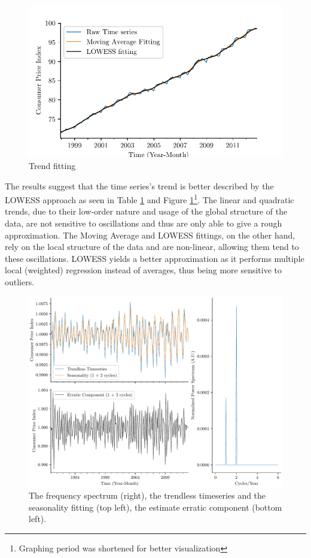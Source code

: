\documentclass[conference]{IEEEtran}
\begin{document}
\begin{figure}[hbtp]
    \centering
    \includegraphics[scale=0.68]{../figs/trend.pdf}
    \caption{Trend fitting}
    \label{fig:trend}
\end{figure}

The results suggest that the time series's trend is better described by the LOWESS approach as seen in Table \ref{fig:trend} and Figure \ref{fig:trend}\footnote{Graphing period was shortened for better visualization}. The linear and quadratic trends, due to their low-order nature and usage of the global structure of the data, are not sensitive to oscillations and thus are only able to give a rough approximation. The Moving Average and LOWESS fittings, on the other hand, rely on the local structure of the data and are non-linear, allowing them tend to these oscillations. LOWESS yields a better approximation as it performs multiple local (weighted) regression instead of averages, thus being more sensitive to outliers.

\begin{figure}[hbtp]
    \centering
    \includegraphics[scale=0.7]{../figs/season.pdf}
    \caption{The frequency spectrum (right), the trendless timeseries and the seasonality fitting (top left), the estimate erratic component (bottom left).}
    \label{fig:season}
\end{figure}
\end{document}
